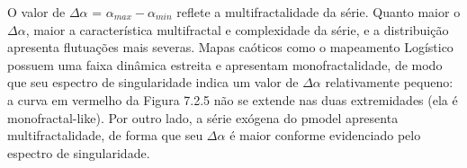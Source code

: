 O valor de $\Delta \alpha$ = $\alpha_{max} - \alpha_{min}$ reflete a multifractalidade da série. Quanto maior o $\Delta \alpha$, maior a característica multifractal e complexidade da série, e a distribuição apresenta flutuações mais severas. Mapas caóticos como o mapeamento Logístico possuem uma faixa dinâmica estreita e apresentam monofractalidade, de modo que seu espectro de singularidade indica um valor de $\Delta \alpha$ relativamente pequeno: a curva em vermelho da Figura 7.2.5 não se extende nas duas extremidades (ela é monofractal-like). Por outro lado, a série exógena do pmodel apresenta multifractalidade, de forma que seu $\Delta \alpha$ é maior conforme evidenciado pelo espectro de singularidade.

\begin{figure}[ht!]
	\vspace{0mm}	%
	\begin{center}
	\end{center}
	\vspace{-2mm}	%
	\label{ex6_fig1}
\end{figure}

